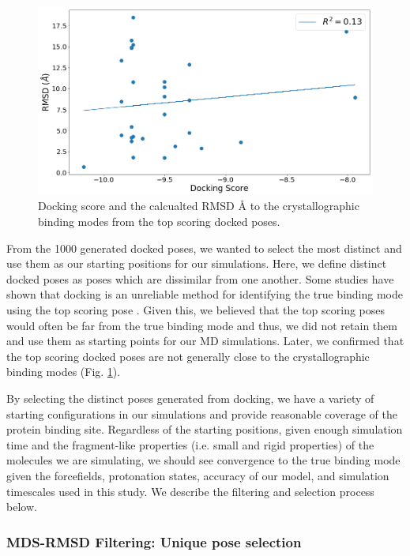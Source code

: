 \begin{figure}
    \centering
    \includegraphics{chapter6/Figures/topscore.png}
    \caption{Docking score and the calcualted RMSD {\AA} to the crystallographic binding modes from the top scoring docked poses.}
    \label{fig:topscore}
\end{figure}

From the 1000 generated docked poses, we wanted to select the most distinct and use them as our starting positions for our simulations.
Here, we define distinct docked poses as poses which are dissimilar from one another.
Some studies have shown that docking is an unreliable method for identifying the true binding mode using the top scoring pose \cite{warren_critical_2006}.
Given this, we believed that the top scoring poses would often be far from the true binding mode and thus, we did not retain them and use them as starting points for our MD simulations.
Later, we confirmed that the top scoring docked poses are not generally close to the crystallographic binding modes (Fig. \ref{fig:topscore}).

By selecting the distinct poses generated from docking, we have a variety of starting configurations in our simulations and provide reasonable coverage of the protein binding site.
Regardless of the starting positions, given enough simulation time and the fragment-like properties (i.e. small and rigid properties) of the molecules we are simulating, we should see convergence to the true binding mode given the forcefields, protonation states, accuracy of our model, and simulation timescales used in this study.
We describe the filtering and selection process below.

\subsubsection{MDS-RMSD Filtering: Unique pose selection}

